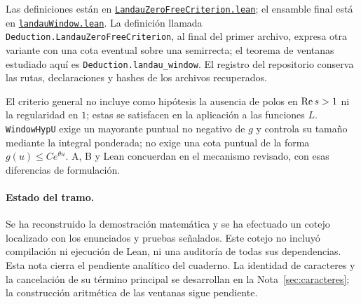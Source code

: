 {\raggedright
Las definiciones están en
\href{https://github.com/CocoSgt/riemann-hypothesis-lean/blob/7cbf7a0c32fca1badf05931879a37c3f8a2b03b4/src/Development/AutomorphicArithmetic/DedekindLFunctions/LandauZeroFreeCriterion.lean}
{\texttt{LandauZeroFreeCriterion.lean}};
el ensamble final está en
\href{https://github.com/CocoSgt/riemann-hypothesis-lean/blob/7cbf7a0c32fca1badf05931879a37c3f8a2b03b4/src/Development/AutomorphicArithmetic/DedekindLFunctions/LandauTheorems/landauWindow.lean}
{\texttt{landauWindow.lean}}.
La definición llamada
\texttt{Deduction.}\allowbreak\texttt{LandauZeroFreeCriterion},
al final del primer archivo, expresa otra variante con una cota eventual
sobre una semirrecta; el teorema de ventanas estudiado aquí es
\texttt{Deduction.landau\_window}.
El registro del repositorio conserva las rutas, declaraciones y hashes
de los archivos recuperados.
\par}

El criterio general no incluye como hipótesis la ausencia de polos en
$\operatorname{Re} s>1$ ni la regularidad en $1$; estas se satisfacen en la aplicación
a las funciones $L$. \texttt{WindowHypU} exige un mayorante puntual
no negativo de $g$ y controla su tamaño mediante la integral ponderada;
no exige una cota puntual de la forma $g(u)\le Ce^{\theta u}$.
A, B y Lean concuerdan en el mecanismo revisado, con esas diferencias
de formulación.

\paragraph{Estado del tramo.}
Se ha reconstruido la demostración matemática y se ha efectuado un
cotejo localizado con los enunciados y pruebas señalados.
Este cotejo no incluyó compilación ni ejecución de Lean, ni una auditoría
de todas sus dependencias. Esta nota cierra el pendiente analítico del
cuaderno. La identidad de caracteres y la cancelación de su término
principal se desarrollan en la Nota~\ref{sec:caracteres}; la construcción
aritmética de las ventanas sigue pendiente.
